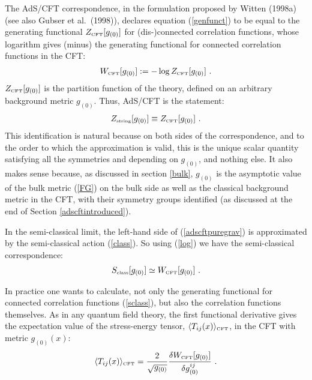 \documentclass[12pt]{article}
\newcommand\bra[1]{{\langle {#1}|}}
\newcommand\ket[1]{{|{#1}\rangle}}
\def\d{\delta}
\def\bra{\langle}
\def\ket{\rangle}
\def\d{\delta}
\renewcommand{\^}[1]{\hat{#1}}
\newcommand{\tn}[1]{\mbox{\tiny #1}}
\newcommand{\bea}{\begin{eqnarray}}
\newcommand{\eea}{\end{eqnarray}}
\newcommand{\eq}[1]{(\ref{#1})}
\begin{document}


The AdS/CFT correspondence, in the formulation proposed by Witten (1998a) (see also Gubser et al.~(1998)), declares equation \eq{genfunct} to be equal to the generating functional $Z_{\tn{CFT}}[g_{(0)}]$ for (dis-)connected correlation functions, whose logarithm gives (minus) the generating functional for connected correlation functions in the CFT:
\bea\label{log}
W_{\tn{CFT}}[g_{(0)}]:=-\log Z_{\tn{CFT}}[g_{(0)}]~.
\eea
$Z_{\tn{CFT}}[g_{(0)}]$ is the partition function of the theory, defined on an arbitrary background metric $g_{(0)}$. Thus, AdS/CFT is the statement:
\bea\label{adscftpuregrav}
Z_{\tn{string}}[g_{(0)}]\equiv Z_{\tn{CFT}}[g_{(0)}]~.
\eea
This identification is natural because on both sides of the correspondence, and to the order to which the approximation is valid, this is the unique scalar quantity satisfying all the symmetries and depending on $g_{(0)}$, and nothing else. It also makes sense because, as discussed in section \ref{bulk}, $g_{(0)}$ is the asymptotic value of the bulk metric \eq{FG} on the bulk side as well as the classical background metric in the CFT, with their symmetry groups identified (as discussed at the end of Section \ref{adscftintroduced}).

In the semi-classical limit, the left-hand side of \eq{adscftpuregrav} is approximated by the semi-classical action \eq{class}. So using \eq{log} we have the semi-classical correspondence:
\bea\label{sclass}
S_{\tn{class}}[g_{(0)}]\simeq W_{\tn{CFT}}[g_{(0)}]~.
\eea

In practice one wants to calculate, not only  the generating functional for connected correlation functions \eq{sclass}, but also the correlation functions themselves. As in any quantum field theory,  the first functional derivative gives the expectation value of the stress-energy tensor, $\bra T_{ij}(x)\ket_{\tn{CFT}}$, in the CFT with metric $g_{(0)}(x)$:
\bea\label{Tij}
\bra T_{ij}(x)\ket_{\tn{CFT}}={2\over\sqrt{g_{(0)}}}{\d W_{\tn{CFT}}[g_{(0)}]\over\d g^{ij}_{(0)}}~.
\eea
\end{document}
